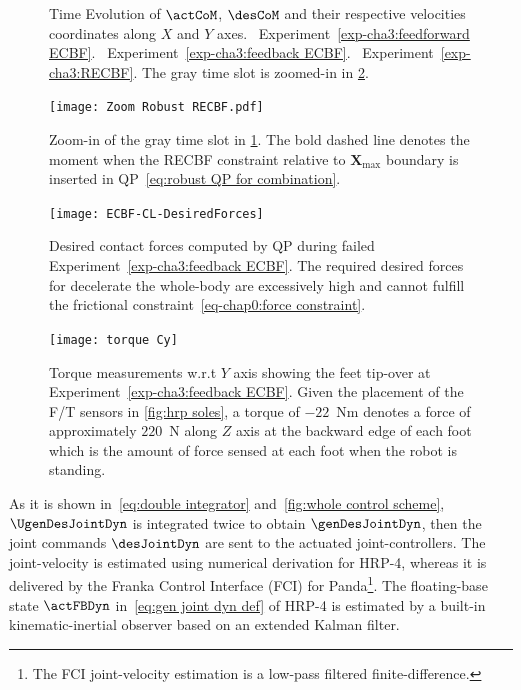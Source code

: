 \begin{figure}
	\centering
	\hfil
\caption{Time Evolution of $\actCoM$, $\desCoM$ and their respective velocities coordinates along ${X}$ and ${Y}$ axes.~ Experiment~\ref{exp-cha3:feedforward ECBF}.~ Experiment~\ref{exp-cha3:feedback ECBF}.~ Experiment~\ref{exp-cha3:RECBF}. The gray time slot is zoomed-in in \cref{fig:com_Robust Zoom}.}
\label{fig:com}
\end{figure}
\begin{figure}
	\centering
	\texttt{[image: Zoom Robust RECBF.pdf]}
	\caption{Zoom-in of the gray time slot in \cref{fig:com}. The bold dashed line denotes the moment when the RECBF constraint relative to $\mathbf{X}_{\max}$ boundary is inserted in QP~\cref{eq:robust QP for combination}.}
	\label{fig:com_Robust Zoom}
\end{figure}
\begin{figure}
	\centering
	\texttt{[image: ECBF-CL-DesiredForces]}
	\caption{Desired contact forces computed by QP during failed Experiment~\cref{exp-cha3:feedback ECBF}. The required desired forces for decelerate the whole-body are excessively high and cannot fulfill the frictional constraint~\eqref{eq-chap0:force constraint}.}
	\label{fig:desired Forces}
\end{figure}
\begin{figure}
	\centering
	\texttt{[image: torque Cy]}
	\caption{Torque measurements w.r.t ${Y}$ axis showing the feet tip-over at Experiment~\cref{exp-cha3:feedback ECBF}. Given the placement of the F/T sensors in \cref{fig:hrp soles}, a torque of $-22$~Nm denotes a force of approximately $220$~N along ${Z}$ axis at the backward edge of each foot which is the amount of force sensed at each foot when the robot is standing.}
	\label{fig:tip over torque}
\end{figure}
As it is shown in~\cref{eq:double integrator} and~\cref{fig:whole control scheme}, $\UgenDesJointDyn$ is integrated twice to obtain $\genDesJointDyn$, then the joint commands $\desJointDyn$ are sent to the actuated joint-controllers. The joint-velocity is estimated using numerical derivation for HRP-4, whereas it is delivered by the Franka Control Interface (FCI) for Panda\footnote{The FCI joint-velocity estimation is a low-pass filtered finite-difference.}. The floating-base state $\actFBDyn$ in~\cref{eq:gen joint dyn def} of HRP-4 is estimated by a built-in kinematic-inertial observer based on an extended Kalman filter. 

